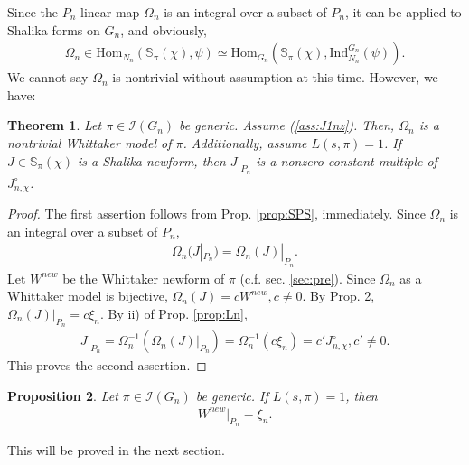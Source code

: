 \documentclass[11pt]{amsart}
\newcommand\Sb{{\mathbb{S}}}
\newcommand\1{\mathbf{1}}
\newcommand\nid{\noindent}
\newcommand\In{{\mathrm{Ind}}}%
\newcommand\Hom{{\mathrm{Hom}}}%
\newcommand\Ir{{\mathscr{I}}}
\numberwithin{equation}{section}
\newtheorem{thm}{Theorem}[section]
\newtheorem{prop}[thm]{Proposition}
\begin{document}
\nid 
Since the $P_n$-linear map $\Omega_n$ is an integral over a subset of $P_n$, it can be applied to Shalika forms on $G_n$, and obviously, 
\begin{align*}
\Omega_n \in \Hom_{N_n}(\Sb_\pi(\chi), \psi) \simeq \Hom_{G_n}(\Sb_\pi(\chi), \In_{N_n}^{G_n}(\psi)).
\end{align*} 
We cannot say $\Omega_n$ is nontrivial without assumption at this time.
However, we have:
\begin{thm}\label{thm:Ln}
Let $\pi \in \Ir(G_n)$ be generic.
Assume (\ref{ass:J1nz}).
Then, $\Omega_n$ is a nontrivial Whittaker model of $\pi$.
Additionally, assume $L(s,\pi) = 1$.
If $J \in \Sb_\pi(\chi)$ is a Shalika newform, then $J|_{P_n}$ is a nonzero constant multiple of $J_{n,\chi}^\circ$.
\end{thm}
\begin{proof}
The first assertion follows from Prop. \ref{prop:SPS}, immediately.
Since $\Omega_n$ is an integral over a subset of $P_n$, 
\begin{align*}
\Omega_n(J|_{P_n}) = \Omega_n(J)|_{P_n}.
\end{align*}
Let $W^{new}$ be the Whittaker newform of $\pi$ (c.f. sec. \ref{sec:pre}).
Since $\Omega_n$ as a Whittaker model is bijective, $\Omega_n(J) = c W^{new}, c \neq 0$.
By Prop. \ref{prop:LW}, $\Omega_n(J)|_{P_n} = c \xi_n$.
By ii) of Prop. \ref{prop:Ln},
\begin{align*}
J|_{P_n} = \Omega_n^{-1}(\Omega_n(J)|_{P_n}) = \Omega_n^{-1}(c \xi_n) = c' J_{n,\chi}^\circ, c' \neq 0.
\end{align*} 
This proves the second assertion.
\end{proof}
\begin{prop}\label{prop:LW}
Let $\pi \in \Ir(G_n)$ be generic.
If $L(s,\pi) = 1$, then 
\begin{align*}
W^{new}|_{P_n} = \xi_n.
\end{align*}
\end{prop}
\nid
This will be proved in the next section.
\end{document}
